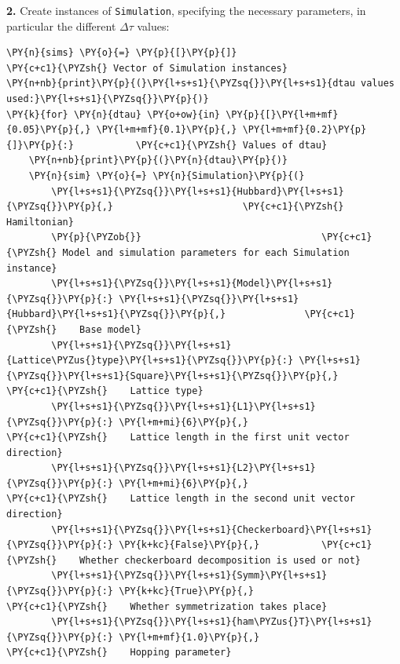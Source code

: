     \textbf{2.} Create instances of \texttt{Simulation}, specifying the
necessary parameters, in particular the different \(\Delta \tau\)
values:

    \begin{tcolorbox}[breakable, size=fbox, boxrule=1pt, pad at break*=1mm,colback=cellbackground, colframe=cellborder]
\begin{Verbatim}[commandchars=\\\{\}]
\PY{n}{sims} \PY{o}{=} \PY{p}{[}\PY{p}{]}                                \PY{c+c1}{\PYZsh{} Vector of Simulation instances}
\PY{n+nb}{print}\PY{p}{(}\PY{l+s+s1}{\PYZsq{}}\PY{l+s+s1}{dtau values used:}\PY{l+s+s1}{\PYZsq{}}\PY{p}{)}
\PY{k}{for} \PY{n}{dtau} \PY{o+ow}{in} \PY{p}{[}\PY{l+m+mf}{0.05}\PY{p}{,} \PY{l+m+mf}{0.1}\PY{p}{,} \PY{l+m+mf}{0.2}\PY{p}{]}\PY{p}{:}           \PY{c+c1}{\PYZsh{} Values of dtau}
    \PY{n+nb}{print}\PY{p}{(}\PY{n}{dtau}\PY{p}{)}
    \PY{n}{sim} \PY{o}{=} \PY{n}{Simulation}\PY{p}{(}
        \PY{l+s+s1}{\PYZsq{}}\PY{l+s+s1}{Hubbard}\PY{l+s+s1}{\PYZsq{}}\PY{p}{,}                       \PY{c+c1}{\PYZsh{} Hamiltonian}
        \PY{p}{\PYZob{}}                                \PY{c+c1}{\PYZsh{} Model and simulation parameters for each Simulation instance}
        \PY{l+s+s1}{\PYZsq{}}\PY{l+s+s1}{Model}\PY{l+s+s1}{\PYZsq{}}\PY{p}{:} \PY{l+s+s1}{\PYZsq{}}\PY{l+s+s1}{Hubbard}\PY{l+s+s1}{\PYZsq{}}\PY{p}{,}              \PY{c+c1}{\PYZsh{}    Base model}
        \PY{l+s+s1}{\PYZsq{}}\PY{l+s+s1}{Lattice\PYZus{}type}\PY{l+s+s1}{\PYZsq{}}\PY{p}{:} \PY{l+s+s1}{\PYZsq{}}\PY{l+s+s1}{Square}\PY{l+s+s1}{\PYZsq{}}\PY{p}{,}        \PY{c+c1}{\PYZsh{}    Lattice type}
        \PY{l+s+s1}{\PYZsq{}}\PY{l+s+s1}{L1}\PY{l+s+s1}{\PYZsq{}}\PY{p}{:} \PY{l+m+mi}{6}\PY{p}{,}                         \PY{c+c1}{\PYZsh{}    Lattice length in the first unit vector direction}
        \PY{l+s+s1}{\PYZsq{}}\PY{l+s+s1}{L2}\PY{l+s+s1}{\PYZsq{}}\PY{p}{:} \PY{l+m+mi}{6}\PY{p}{,}                         \PY{c+c1}{\PYZsh{}    Lattice length in the second unit vector direction}
        \PY{l+s+s1}{\PYZsq{}}\PY{l+s+s1}{Checkerboard}\PY{l+s+s1}{\PYZsq{}}\PY{p}{:} \PY{k+kc}{False}\PY{p}{,}           \PY{c+c1}{\PYZsh{}    Whether checkerboard decomposition is used or not}
        \PY{l+s+s1}{\PYZsq{}}\PY{l+s+s1}{Symm}\PY{l+s+s1}{\PYZsq{}}\PY{p}{:} \PY{k+kc}{True}\PY{p}{,}                    \PY{c+c1}{\PYZsh{}    Whether symmetrization takes place}
        \PY{l+s+s1}{\PYZsq{}}\PY{l+s+s1}{ham\PYZus{}T}\PY{l+s+s1}{\PYZsq{}}\PY{p}{:} \PY{l+m+mf}{1.0}\PY{p}{,}                    \PY{c+c1}{\PYZsh{}    Hopping parameter}

\end{Verbatim}
\end{tcolorbox}
